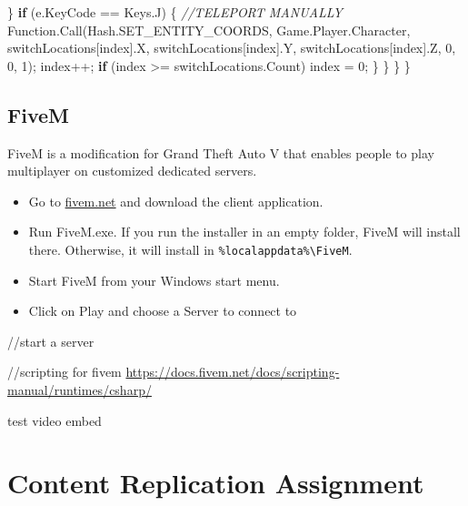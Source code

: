 \documentclass[
  openany]{book}
\newenvironment{Shaded}{\begin{snugshade}}{\end{snugshade}}
\newcommand{\CommentTok}[1]{\textcolor[rgb]{0.56,0.35,0.01}{\textit{#1}}}
\newcommand{\DecValTok}[1]{\textcolor[rgb]{0.00,0.00,0.81}{#1}}
\newcommand{\FunctionTok}[1]{\textcolor[rgb]{0.00,0.00,0.00}{#1}}
\newcommand{\KeywordTok}[1]{\textcolor[rgb]{0.13,0.29,0.53}{\textbf{#1}}}
\newcommand{\NormalTok}[1]{#1}
\begin{document}
\begin{Shaded}
\begin{Highlighting}[]
\NormalTok{           \}}
           \KeywordTok{if}\NormalTok{ (e.}\FunctionTok{KeyCode}\NormalTok{ == Keys.}\FunctionTok{J}\NormalTok{)}
\NormalTok{           \{}
              \CommentTok{//TELEPORT MANUALLY}
\NormalTok{              Function.}\FunctionTok{Call}\NormalTok{(Hash.}\FunctionTok{SET_ENTITY_COORDS}\NormalTok{, Game.}\FunctionTok{Player}\NormalTok{.}\FunctionTok{Character}\NormalTok{, switchLocations[index].}\FunctionTok{X}\NormalTok{, switchLocations[index].}\FunctionTok{Y}\NormalTok{, switchLocations[index].}\FunctionTok{Z}\NormalTok{, }\DecValTok{0}\NormalTok{, }\DecValTok{0}\NormalTok{, }\DecValTok{1}\NormalTok{);}
\NormalTok{              index++;}
              \KeywordTok{if}\NormalTok{ (index >= switchLocations.}\FunctionTok{Count}\NormalTok{) index = }\DecValTok{0}\NormalTok{;}
\NormalTok{            \}}
\NormalTok{        \}}
\NormalTok{    \}}
\NormalTok{\}}


\end{Highlighting}
\end{Shaded}

\hypertarget{fivem}{%
\subsection*{FiveM}\label{fivem}}

FiveM is a modification for Grand Theft Auto V that enables people to play multiplayer on customized dedicated servers.

\begin{itemize}
\item
  Go to \href{https://fivem.net/}{fivem.net} and download the client application.
\item
  Run FiveM.exe. If you run the installer in an empty folder, FiveM will install there. Otherwise, it will install in \texttt{\%localappdata\%\textbackslash{}FiveM}.
\item
  Start FiveM from your Windows start menu.
\item
  Click on Play and choose a Server to connect to
\end{itemize}

//start a server

//scripting for fivem
\url{https://docs.fivem.net/docs/scripting-manual/runtimes/csharp/}

test video embed

\hypertarget{content-replication-assignment-7}{%
\section*{Content Replication Assignment}\label{content-replication-assignment-7}}
\end{document}
